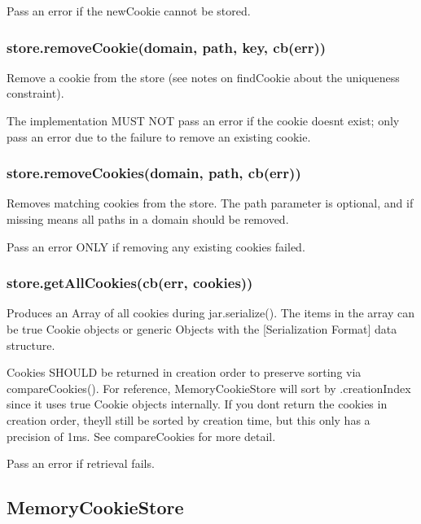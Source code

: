 Pass an error if the new\+Cookie cannot be stored.

\subsubsection*{{\ttfamily store.\+remove\+Cookie(domain, path, key, cb(err))}}

Remove a cookie from the store (see notes on {\ttfamily find\+Cookie} about the uniqueness constraint).

The implementation M\+U\+ST N\+OT pass an error if the cookie doesn\textquotesingle{}t exist; only pass an error due to the failure to remove an existing cookie.

\subsubsection*{{\ttfamily store.\+remove\+Cookies(domain, path, cb(err))}}

Removes matching cookies from the store. The {\ttfamily path} parameter is optional, and if missing means all paths in a domain should be removed.

Pass an error O\+N\+LY if removing any existing cookies failed.

\subsubsection*{{\ttfamily store.\+get\+All\+Cookies(cb(err, cookies))}}

Produces an {\ttfamily Array} of all cookies during {\ttfamily jar.\+serialize()}. The items in the array can be true {\ttfamily Cookie} objects or generic {\ttfamily Object}s with the \mbox{[}Serialization Format\mbox{]} data structure.

Cookies S\+H\+O\+U\+LD be returned in creation order to preserve sorting via {\ttfamily compare\+Cookies()}. For reference, {\ttfamily Memory\+Cookie\+Store} will sort by {\ttfamily .creation\+Index} since it uses true {\ttfamily Cookie} objects internally. If you don\textquotesingle{}t return the cookies in creation order, they\textquotesingle{}ll still be sorted by creation time, but this only has a precision of 1ms. See {\ttfamily compare\+Cookies} for more detail.

Pass an error if retrieval fails.

\subsection*{Memory\+Cookie\+Store}

